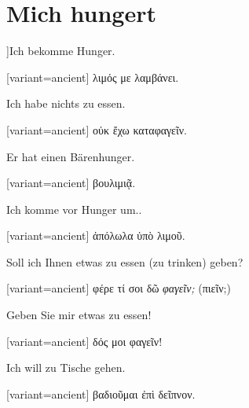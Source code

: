 \section{Mich hungert}

]\indent Ich bekomme Hunger.

\switchcolumn

\begin{greek}[variant=ancient]%
λιμός με λαμβάνει.

\end{greek}%
\switchcolumn*

Ich habe nichts zu essen.

\switchcolumn

\begin{greek}[variant=ancient]%
οὐκ ἔχω καταφαγεῖν.

\end{greek}%
\switchcolumn*

Er hat einen Bärenhunger.

\switchcolumn

\begin{greek}[variant=ancient]%
βουλιμιᾷ.

\end{greek}%
\switchcolumn*

Ich komme vor Hunger um..

\switchcolumn

\begin{greek}[variant=ancient]%
ἀπόλωλα ὑπὸ λιμοῦ.

\end{greek}%
\switchcolumn*

Soll ich Ihnen etwas zu essen (zu trinken) geben?

\switchcolumn

\begin{greek}[variant=ancient]%
φέρε τί σοι δῶ \emph{φαγεῖν;} (πιεῖν;)

\end{greek}%
\switchcolumn*

Geben Sie mir etwas zu essen!

\switchcolumn

\begin{greek}[variant=ancient]%
δός μοι φαγεῖν!

\end{greek}%
\switchcolumn*

Ich will zu Tische gehen.

\switchcolumn

\begin{greek}[variant=ancient]%
βαδιοῦμαι ἐπὶ δεῖπνον.

\end{greek}%
\switchcolumn*

